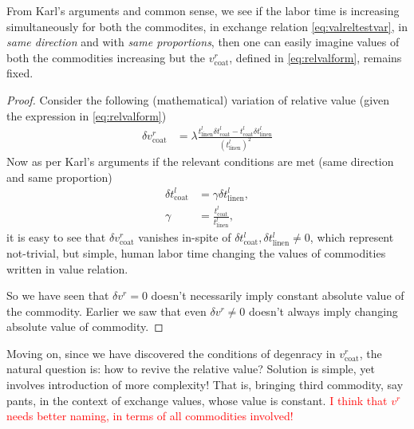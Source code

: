 \documentclass[12pt]{extarticle}
\theoremstyle{definition}
\begin{document}
 From Karl's arguments and common sense, we see if the labor time is increasing simultaneously for both the commodites, in exchange relation \ref{eq:valreltestvar}, in \emph{same direction} and with \emph{same proportions}, then one can easily imagine values of both the commodities increasing but the $v_{\text{coat}}^{r}$, defined in \ref{eq:relvalform}, remains fixed.

 \begin{proof}
   Consider the following (mathematical) variation of relative value (given the expression in \ref{eq:relvalform})
   \begin{align}
     \label{eq:variationdemo}
      \delta v_{\text{coat}}^{r} &= \lambda\frac{t_{\text{linen}}^l\delta{t_{\text{coat}}^l} - t_{\text{coat}}^l\delta{t_{\text{linen}}^l}}{\left(t_{\text{linen}}^l\right)^2}
   \end{align}
   Now as per Karl's arguments if the relevant conditions are met (same direction and same proportion)
   \begin{align}
     \delta{t_{\text{coat}}^l} &= \gamma \delta{t_{\text{linen}}^l},\\
     \gamma &= \frac{t_{\text{coat}}^l}{t_{\text{linen}}^l},
   \end{align}
   it is easy to see that $\delta v_{\text{coat}}^{r}$ vanishes in-spite of $ \delta{t_{\text{coat}}^l}, \delta{t_{\text{linen}}^l} \neq 0$, which represent not-trivial, but simple, human labor time changing the values of commodities written in value relation.

   So we have seen that $\delta v^r = 0$ doesn't necessarily imply constant absolute value of the commodity.  Earlier we saw that even $\delta v^r \neq 0$ doesn't always imply changing absolute value of commodity.
 \end{proof}

 Moving on, since we have discovered the conditions of degenracy in $v_{\text{coat}}^r$, the natural question is: how to revive the relative value?
 Solution is simple, yet involves introduction of more complexity!  That is, bringing third commodity, say pants, in the context of exchange values, whose value is constant.  \textcolor{red}{I think that $v^r$ needs better naming, in terms of all commodities involved!}
\end{document}
